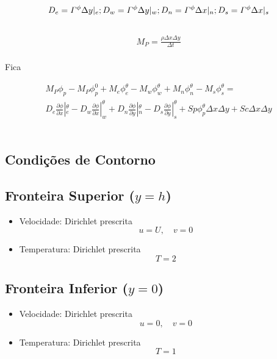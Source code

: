 \documentclass[]{article}
\begin{document}
\begin{equation*}
	\begin{aligned}
		D_e = \varGamma^{\phi} \Delta y\arrowvert_{e} ; D_w = \varGamma^{\phi} \Delta y\arrowvert_{w} ; D_n = \varGamma^{\phi} \Delta x\arrowvert_{n} ; D_s = \varGamma^{\phi} \Delta x\arrowvert_{s}
	\end{aligned}		
\end{equation*}\\
\begin{equation*}
	\begin{aligned}
		M_P = \frac{\rho \Delta x \Delta y }{\Delta t}
	\end{aligned}		
\end{equation*}\\

Fica

\begin{equation}
	\begin{aligned}
		M_P\phi_{p} - M_P\phi_{p}^{0} + M_e\phi_{e}^{\theta} - M_w\phi_{w}^{\theta}  + M_n\phi_{n}^{\theta}  - M_s\phi_{s}^{\theta}  =\\
		D_e\frac{\partial \phi}{\partial x}|_{e}^{\theta} - 
		D_w\frac{\partial \phi}{\partial x}|_{w}^{\theta} + 
		D_n\frac{\partial \phi}{\partial y}|_{n}^{\theta} - 
		D_s\frac{\partial \phi}{\partial y}|_{s}^{\theta} + Sp\phi_{p}^{\theta}\Delta x \Delta y + Sc\Delta x \Delta y
	\end{aligned}		
\end{equation}\\


\subsection*{Condições de Contorno}


\subsection*{Fronteira Superior (\(y = h\))}
\begin{itemize}
	\item Velocidade: Dirichlet prescrita
	\[
	u = U, \quad v = 0
	\]
	
	\item Temperatura: Dirichlet prescrita
	\[
	T = 2
	\]
	
\end{itemize}

\subsection*{Fronteira Inferior (\(y = 0\))}
\begin{itemize}
	\item Velocidade: Dirichlet prescrita 
	\[
	u = 0, \quad v = 0
	\]
	
	\item Temperatura: Dirichlet prescrita
	\[
	T = 1
	\]
	
\end{itemize}
\end{document}
